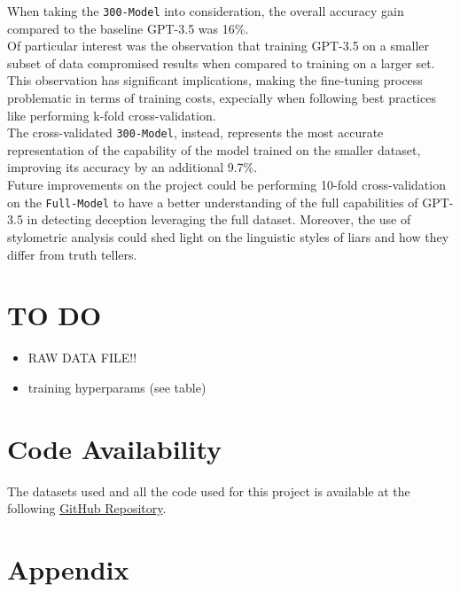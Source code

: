 \documentclass[10pt,twocolumn,letterpaper]{article}
\begin{document}
When taking the \texttt{300-Model} into consideration, the overall accuracy gain compared to the baseline GPT-3.5 was 16\%. \\ 

Of particular interest was the observation that training GPT-3.5 on a smaller subset of data compromised
results when compared to training on a larger set. This observation has significant 
implications, making the fine-tuning process problematic in terms of training costs, 
expecially when following best practices like performing k-fold cross-validation. \\

The cross-validated \texttt{300-Model}, instead, represents the most accurate representation of the capability of the model trained
on the smaller dataset, improving its accuracy by an additional 9.7\%. \\

Future improvements on the project could be performing 10-fold cross-validation on the \texttt{Full-Model} to have a better understanding
of the full capabilities of GPT-3.5 in detecting deception leveraging the full dataset. Moreover, the use of stylometric analysis could shed
light on the linguistic styles of liars and how they differ from truth tellers.

\section{TO DO}

\begin{itemize}
    \item RAW DATA FILE!!
    \item training hyperparams (see table)
\end{itemize}

\section{Code Availability}
The datasets used and all the code used for this project is available
at the following \href{https://github.com/TannerAGraves/GPT-LieDetection/}{GitHub Repository}.



{\small


}

\clearpage %
\onecolumn %

\section{Appendix}
\label{sec:appendix}
\end{document}
